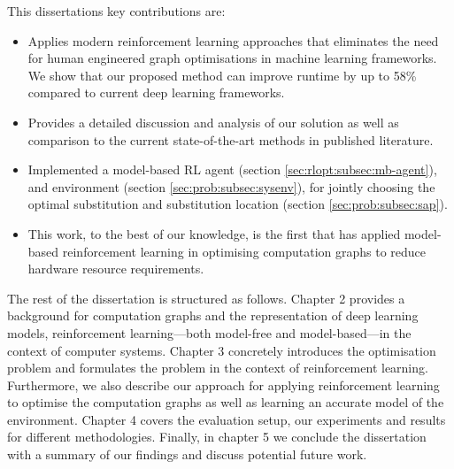 This dissertations key contributions are:

\begin{itemize}
  \item Applies modern reinforcement learning approaches that eliminates the need for human engineered graph optimisations in machine learning frameworks. We show that our proposed method can improve runtime by up to 58\% compared to current deep learning frameworks.
  \item Provides a detailed discussion and analysis of our solution as well as comparison to the current state-of-the-art methods in published literature.
  \item Implemented a model-based RL agent (section \ref{sec:rlopt:subsec:mb-agent}), and environment (section \ref{sec:prob:subsec:sysenv}), for jointly choosing the optimal substitution and substitution location (section \ref{sec:prob:subsec:sap}).
  \item This work, to the best of our knowledge, is the first that has applied model-based reinforcement learning in optimising computation graphs to reduce hardware resource requirements.
\end{itemize}

The rest of the dissertation is structured as follows. Chapter 2 provides a background for computation graphs and the representation of deep learning models, reinforcement learning---both model-free and model-based---in the context of computer systems. Chapter 3 concretely introduces the optimisation problem and formulates the problem in the context of reinforcement learning. Furthermore, we also describe our approach for applying reinforcement learning to optimise the computation graphs as well as learning an accurate model of the environment. Chapter 4 covers the evaluation setup, our experiments and results for different methodologies. Finally, in chapter 5 we conclude the dissertation with a summary of our findings and discuss potential future work.